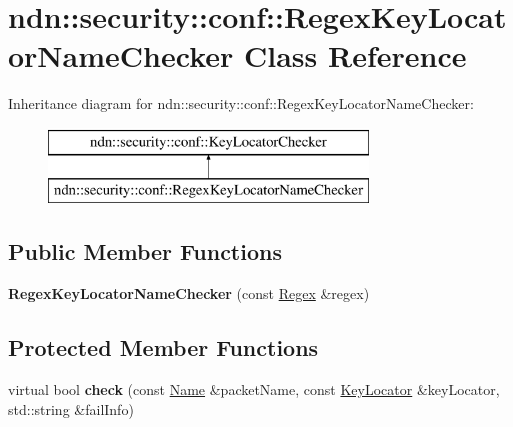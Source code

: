 \hypertarget{classndn_1_1security_1_1conf_1_1RegexKeyLocatorNameChecker}{}\section{ndn\+:\+:security\+:\+:conf\+:\+:Regex\+Key\+Locator\+Name\+Checker Class Reference}
\label{classndn_1_1security_1_1conf_1_1RegexKeyLocatorNameChecker}
Inheritance diagram for ndn\+:\+:security\+:\+:conf\+:\+:Regex\+Key\+Locator\+Name\+Checker\+:\begin{figure}[H]
\begin{center}
\leavevmode
\includegraphics[height=2.000000cm]{classndn_1_1security_1_1conf_1_1RegexKeyLocatorNameChecker}
\end{center}
\end{figure}
\subsection*{Public Member Functions}
\begin{DoxyCompactItemize}
\item 
{\bfseries Regex\+Key\+Locator\+Name\+Checker} (const \hyperlink{classndn_1_1RegexTopMatcher}{Regex} \&regex)\hypertarget{classndn_1_1security_1_1conf_1_1RegexKeyLocatorNameChecker_afd10687098b51e91742814c4bfdf1541}{}\label{classndn_1_1security_1_1conf_1_1RegexKeyLocatorNameChecker_afd10687098b51e91742814c4bfdf1541}

\end{DoxyCompactItemize}
\subsection*{Protected Member Functions}
\begin{DoxyCompactItemize}
\item 
virtual bool {\bfseries check} (const \hyperlink{classndn_1_1Name}{Name} \&packet\+Name, const \hyperlink{classndn_1_1KeyLocator}{Key\+Locator} \&key\+Locator, std\+::string \&fail\+Info)\hypertarget{classndn_1_1security_1_1conf_1_1RegexKeyLocatorNameChecker_adde58e5e814d4da29a6e46b7be33e33d}{}\label{classndn_1_1security_1_1conf_1_1RegexKeyLocatorNameChecker_adde58e5e814d4da29a6e46b7be33e33d}

\end{DoxyCompactItemize}
